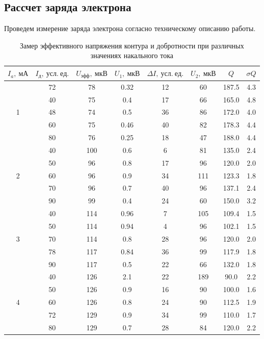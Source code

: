 \documentclass[a4paper, 12pt]{article}%
\begin{document}
	\subsection{Рассчет заряда электрона}
	Проведем измерение заряда электрона согласно техническому описанию работы.\\
	\begin{table}[H]
		\centering
		\begin{tabular}{|c|c|c|c|c|c|c|c|}
			\hline
			$I_a,~ мА$             & $I_д,~ усл.~ ед.$ & $U_{эфф},~мкВ$ &$U_{1},~мкВ$ & $\Delta I, ~усл.~ед.$ & $U_{2},~мкВ$ & $Q$     & $\sigma Q$ \\ \hline
			\multirow{5}{*}{1} & 72  & 78   & 0.32     & 12      & 60  & 187.5 & 4.3     \\ \cline{2-8} 
			& 40  & 75   & 0.4      & 17      & 66  & 165.0 & 4.8     \\ \cline{2-8} 
			& 48  & 74   & 0.5      & 36      & 86  & 172.0 & 4.0     \\ \cline{2-8} 
			& 60  & 75   & 0.46     & 40      & 82  & 178.3 & 4.4     \\ \cline{2-8} 
			& 80  & 76   & 0.25     & 18      & 47  & 188.0 & 4.4     \\ \hline
			\multirow{5}{*}{2} & 40  & 100  & 0.6      & 6       & 81  & 135.0 & 2.4     \\ \cline{2-8} 
			& 50  & 96   & 0.8      & 17      & 96  & 120.0 & 2.0     \\ \cline{2-8} 
			& 60  & 96   & 0.9      & 34      & 111 & 123.3 & 1.8     \\ \cline{2-8} 
			& 70  & 96   & 0.7      & 40      & 96  & 137.1 & 2.4     \\ \cline{2-8} 
			& 90  & 99   & 0.4      & 24      & 60  & 150.0 & 3.2     \\ \hline
			\multirow{5}{*}{3} & 40  & 114  & 0.96     & 7       & 105 & 109.4 & 1.5     \\ \cline{2-8} 
			& 50  & 114  & 0.94     & 4       & 96  & 102.1 & 1.5     \\ \cline{2-8} 
			& 70  & 114  & 0.8      & 28      & 96  & 120.0 & 2.0     \\ \cline{2-8} 
			& 78  & 117  & 0.84     & 36      & 99  & 117.9 & 1.8     \\ \cline{2-8} 
			& 90  & 117  & 0.5      & 22      & 66  & 132.0 & 1.8     \\ \hline
			\multirow{5}{*}{4} & 40  & 126  & 2.1      & 22      & 189 & 90.0  & 2.2     \\ \cline{2-8} 
			& 50  & 126  & 0.9      & 16      & 90  & 100.0 & 1.6     \\ \cline{2-8} 
			& 60  & 126  & 0.8      & 24      & 90  & 112.5 & 1.9     \\ \cline{2-8} 
			& 72  & 129  & 0.9      & 34      & 99  & 110.0 & 1.7     \\ \cline{2-8} 
			& 80  & 129  & 0.7      & 28      & 84  & 120.0 & 2.2     \\ \hline
		\end{tabular}
		\caption{Замер эффективного напряжения контура и добротности при различных значениях накального тока}
	\end{table}
\end{document}

